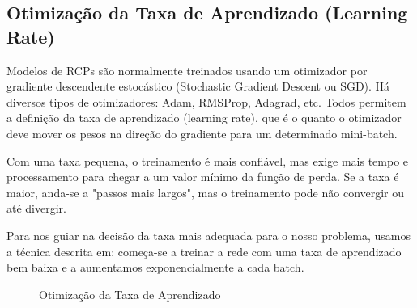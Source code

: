 \documentclass[conference]{IEEEtran}
\begin{document}
\subsection{Otimização da Taxa de Aprendizado (Learning Rate)}

Modelos de RCPs são normalmente treinados usando um otimizador por gradiente descendente estocástico (Stochastic Gradient Descent ou SGD). Há diversos tipos de otimizadores: Adam, RMSProp, Adagrad, etc. Todos permitem a definição da taxa de aprendizado (learning rate), que é o quanto o otimizador deve mover os pesos na direção do gradiente para um determinado mini-batch.

Com uma taxa pequena, o treinamento é mais confiável, mas exige mais tempo e processamento para chegar a um valor mínimo da função de perda. Se a taxa é maior, anda-se a "passos mais largos", mas o treinamento pode não convergir ou até divergir. 

Para nos guiar na decisão da taxa mais adequada para o nosso problema, usamos a técnica descrita em\cite{cyclical}: começa-se a treinar a rede com uma taxa de aprendizado bem baixa e a aumentamos exponencialmente a cada batch. 


\begin{figure}
\label{lr_find}
\centering
{}\hfil
{}\hfil 

\caption{Otimização da Taxa de Aprendizado}
\end{figure}
\end{document}
